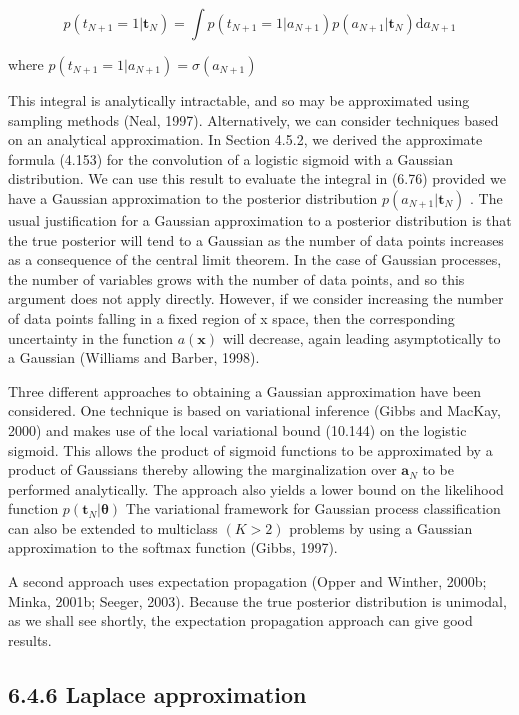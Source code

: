 \documentclass[
  10
]{article}
\begin{document}
\[
p (t _ {N + 1} = 1 | \mathbf {t} _ {N}) = \int p (t _ {N + 1} = 1 | a _ {N + 1}) p (a _ {N + 1} | \mathbf {t} _ {N}) \mathrm{d} a _ {N + 1}\tag{6.76}
\]

where
\(p ( t _ { N + 1 } = 1 | a _ { N + 1 } ) = \sigma ( a _ { N + 1 } )\)

This integral is analytically intractable, and so may be approximated
using sampling methods (Neal, 1997). Alternatively, we can consider
techniques based on an analytical approximation. In Section 4.5.2, we
derived the approximate formula (4.153) for the convolution of a
logistic sigmoid with a Gaussian distribution. We can use this result to
evaluate the integral in (6.76) provided we have a Gaussian
approximation to the posterior distribution
\(p ( a _ { N + 1 } | \mathbf { t } _ { N } )\) . The usual
justification for a Gaussian approximation to a posterior distribution
is that the true posterior will tend to a Gaussian as the number of data
points increases as a consequence of the central limit theorem. In the
case of Gaussian processes, the number of variables grows with the
number of data points, and so this argument does not apply directly.
However, if we consider increasing the number of data points falling in
a fixed region of x space, then the corresponding uncertainty in the
function \(a ( \mathbf { x } )\) will decrease, again leading
asymptotically to a Gaussian (Williams and Barber, 1998).

Three different approaches to obtaining a Gaussian approximation have
been considered. One technique is based on variational inference (Gibbs
and MacKay, 2000) and makes use of the local variational bound (10.144)
on the logistic sigmoid. This allows the product of sigmoid functions to
be approximated by a product of Gaussians thereby allowing the
marginalization over \(\mathbf { a } _ { N }\) to be performed
analytically. The approach also yields a lower bound on the likelihood
function \(p ( \mathbf { t } _ { N } | \boldsymbol { \theta } )\) The
variational framework for Gaussian process classification can also be
extended to multiclass \(( K > 2 )\) problems by using a Gaussian
approximation to the softmax function (Gibbs, 1997).

A second approach uses expectation propagation (Opper and Winther,
2000b; Minka, 2001b; Seeger, 2003). Because the true posterior
distribution is unimodal, as we shall see shortly, the expectation
propagation approach can give good results.

\subsection{6.4.6 Laplace approximation}\label{laplace-approximation-1}
\end{document}
